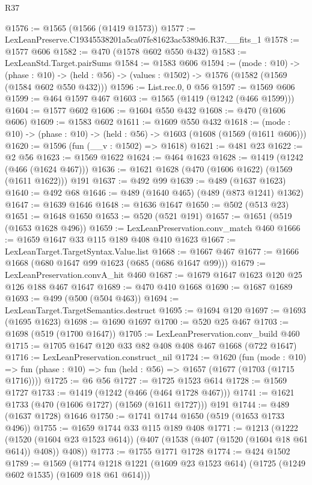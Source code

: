 \begin{lexlean}{R37}
\begin{coremodule}
@1576 := @1565 (@1566 (@1419 @1573))
@1577 := LexLeanPreserve.C19345538201a5ca07fe81623ac5389d6.R37.__fits_1
@1578 := @1577 @606
@1582 := @470 (@1578 @602 @550 @432)
@1583 := LexLeanStd.Target.pairSums
@1584 := @1583 @606
@1594 := (mode : @10) ->
  (phase : @10) -> (held : @56) -> (values : @1502) -> @1576 (@1582 (@1569 (@1584 @602 @550 @432)))
@1596 := List.rec.{0, 0} @56
@1597 := @1569 @606
@1599 := @464 @1597 @467
@1603 := @1565 (@1419 (@1242 (@466 @1599)))
@1604 := @1577 @602
@1606 := @1604 @550 @432
@1608 := @470 (@1606 @606)
@1609 := @1583 @602
@1611 := @1609 @550 @432
@1618 := (mode : @10) -> (phase : @10) -> (held : @56) -> @1603 (@1608 (@1569 (@1611 @606)))
@1620 := @1596 (fun (__v : @1502) => @1618)
@1621 := @481 @23
@1622 := @2 @56
@1623 := @1569 @1622
@1624 := @464 @1623
@1628 := @1419 (@1242 (@466 (@1624 @467)))
@1636 := @1621 @1628 (@470 (@1606 @1622) (@1569 (@1611 @1622))) @191
@1637 := @492 @99
@1639 := @489 (@1637 @1623)
@1640 := @492 @68
@1646 := @489 (@1640 @465) (@489 (@873 @1241) @1362)
@1647 := @1639 @1646
@1648 := @1636 @1647
@1650 := @502 (@513 @23)
@1651 := @1648 @1650
@1653 := @520 (@521 @191)
@1657 := @1651 (@519 (@1653 @1628 @496))
@1659 := LexLeanPreservation.conv_match @460
@1666 := @1659 @1647 @33 @115 @189 @408 @410 @1623
@1667 := LexLeanTarget.TargetSyntax.Value.list
@1668 := @1667 @467
@1677 := @1666 @1668 (@680 @1647 @99 @1623 (@685 (@686 @1647 @99)))
@1679 := LexLeanPreservation.convA_hit @460
@1687 := @1679 @1647 @1623 @120 @25 @126 @188 @467 @1647
@1689 := @470 @410 @1668
@1690 := @1687 @1689
@1693 := @499 (@500 (@504 @463))
@1694 := LexLeanTarget.TargetSemantics.destruct
@1695 := @1694 @120
@1697 := @1693 (@1695 @1623)
@1698 := @1690 @1697
@1700 := @520 @25 @467
@1703 := @1698 (@519 (@1700 @1647))
@1705 := LexLeanPreservation.conv_build @460
@1715 := @1705 @1647 @120 @33 @82 @408 @408 @467 @1668 (@722 @1647)
@1716 := LexLeanPreservation.construct_nil
@1724 := @1620
    (fun (mode : @10) =>
    fun (phase : @10) => fun (held : @56) => @1657 (@1677 (@1703 (@1715 @1716))))
@1725 := @6 @56
@1727 := @1725 @1523 @614
@1728 := @1569 @1727
@1733 := @1419 (@1242 (@466 (@464 @1728 @467)))
@1741 := @1621 @1733 (@470 (@1606 @1727) (@1569 (@1611 @1727))) @191
@1744 := @489 (@1637 @1728) @1646
@1750 := @1741 @1744 @1650 (@519 (@1653 @1733 @496))
@1755 := @1659 @1744 @33 @115 @189 @408
@1771 := @1213
    (@1222
      (@1520 (@1604 @23 @1523 @614))
      (@407 (@1538 (@407 (@1520 (@1604 @18 @61 @614)) @408)) @408))
@1773 := @1755 @1771 @1728
@1774 := @424 @1502
@1789 := @1569
    (@1774 @1218 @1221 (@1609 @23 @1523 @614) (@1725 (@1249 @602 @1535) (@1609 @18 @61 @614)))

\end{coremodule}
\end{lexlean}

